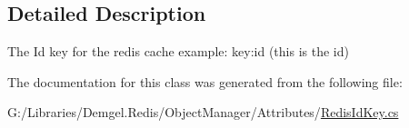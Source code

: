 \subsection{Detailed Description}
The Id key for the redis cache example\+: key\+:id (this is the id) 



The documentation for this class was generated from the following file\+:\begin{DoxyCompactItemize}
\item 
G\+:/\+Libraries/\+Demgel.\+Redis/\+Object\+Manager/\+Attributes/\hyperlink{_redis_id_key_8cs}{Redis\+Id\+Key.\+cs}\end{DoxyCompactItemize}
